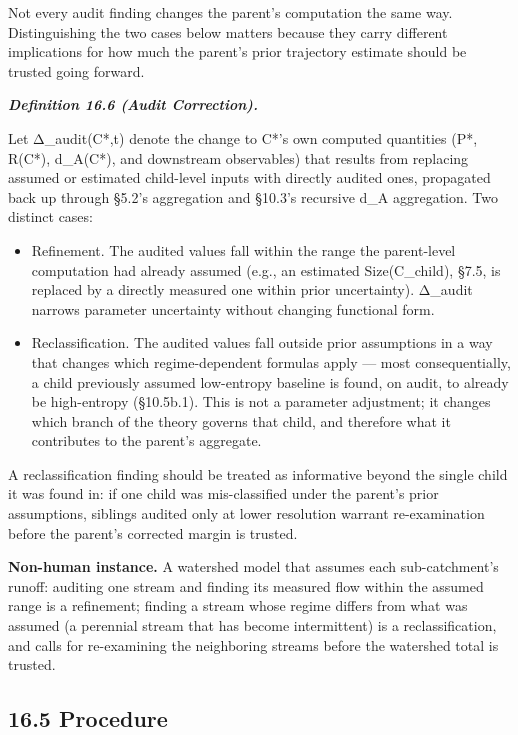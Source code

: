 \documentclass[
]{article}
\begin{document}
Not every audit finding changes the parent's computation the same way.
Distinguishing the two cases below matters because they carry different
implications for how much the parent's prior trajectory estimate should
be trusted going forward.

\emph{\textbf{Definition 16.6 (Audit Correction).}}

Let Δ\_audit(C*,t) denote the change to C*'s own computed quantities
(P*, R(C*), d\_A(C*), and downstream observables) that results from
replacing assumed or estimated child-level inputs with directly audited
ones, propagated back up through §5.2's aggregation and §10.3's
recursive d\_A aggregation. Two distinct cases:

\begin{itemize}
\item
  Refinement. The audited values fall within the range the parent-level
  computation had already assumed (e.g., an estimated Size(C\_child),
  §7.5, is replaced by a directly measured one within prior
  uncertainty). Δ\_audit narrows parameter uncertainty without changing
  functional form.
\item
  Reclassification. The audited values fall outside prior assumptions in
  a way that changes which regime-dependent formulas apply --- most
  consequentially, a child previously assumed low-entropy baseline is
  found, on audit, to already be high-entropy (§10.5b.1). This is not a
  parameter adjustment; it changes which branch of the theory governs
  that child, and therefore what it contributes to the parent's
  aggregate.
\end{itemize}

A reclassification finding should be treated as informative beyond the
single child it was found in: if one child was mis-classified under the
parent's prior assumptions, siblings audited only at lower resolution
warrant re-examination before the parent's corrected margin is trusted.

\textbf{Non-human instance.} A watershed model that assumes each
sub-catchment's runoff: auditing one stream and finding its measured
flow within the assumed range is a refinement; finding a stream whose
regime differs from what was assumed (a perennial stream that has become
intermittent) is a reclassification, and calls for re-examining the
neighboring streams before the watershed total is trusted.

\hypertarget{procedure}{%
\subsection{16.5 Procedure}\label{procedure}}
\end{document}
